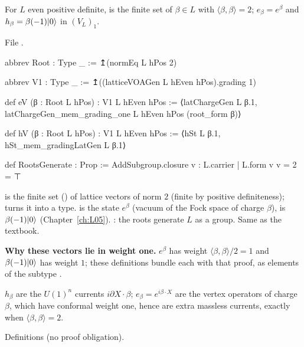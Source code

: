 \begin{definition}\label{l23:def:eVhV}
For $L$ even positive definite,  is the finite set of $\beta\in L$ with $\langle\beta,\beta\rangle=2$;
$e_\beta=e^\beta$ and $h_\beta=\beta(-1)|0\rangle$ in $(V_L)_1$.
\end{definition}
\noindent File .
\begin{leancode}
abbrev Root : Type _ := ↥(normEq L hPos 2)

abbrev V1 : Type _ := ↥((latticeVOAGen L hEven hPos).grading 1)

def eV (β : Root L hPos) : V1 L hEven hPos :=
  ⟨latChargeGen L β.1, latChargeGen_mem_grading_one L hEven hPos (root_form β)⟩

def hV (β : Root L hPos) : V1 L hEven hPos :=
  ⟨hSt L β.1, hSt_mem_gradingLatGen L β.1⟩

def RootsGenerate : Prop := AddSubgroup.closure {v : L.carrier | L.form v v = 2} = ⊤
\end{leancode}

\begin{dictionary}
 is the finite set () of lattice vectors of norm $2$ (finite by positive definiteness);
 turns it into a type.  is the state $e^\beta$ (vacuum of the Fock space of charge $\beta$),
 is $\beta(-1)|0\rangle$ (Chapter~\ref{ch:L05}). : the roots generate $L$ as a group. Same as the textbook.
\end{dictionary}

\textbf{Why these vectors lie in weight one.} $e^\beta$ has weight $\langle\beta,\beta\rangle/2=1$ and $\beta(-1)|0\rangle$ has weight $1$;
these definitions bundle each with that proof, as elements of the subtype .

\begin{physics}
$h_\beta$ are the $U(1)^n$ currents $i\partial X\cdot\beta$; $e_\beta=e^{i\beta\cdot X}$ are the vertex operators of charge $\beta$,
which have conformal weight one, hence are extra massless currents, exactly when $\langle\beta,\beta\rangle=2$.
\end{physics}

\begin{status}
Definitions (no proof obligation).
\end{status}

